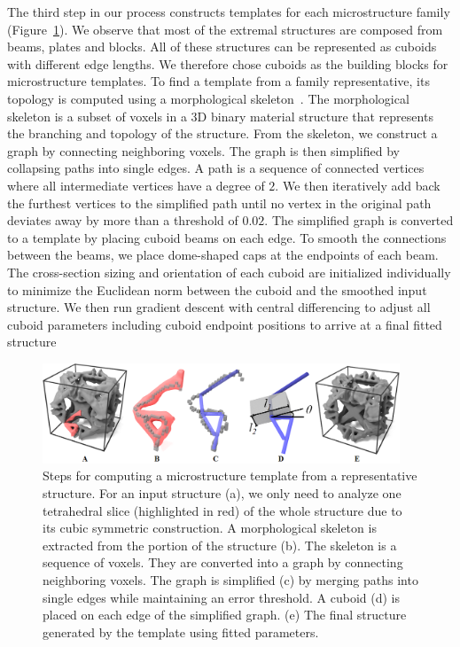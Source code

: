 The third step in our process constructs templates for each microstructure family (Figure~\ref{fig:skelExtract}). We observe that most of the extremal structures are composed from beams, plates and blocks. All of these structures can be represented as cuboids with different edge lengths.
We therefore chose cuboids as the building blocks for microstructure templates.
To find a template from a family representative, its topology is computed using a morphological skeleton~\citep{lee1994building}.
The morphological skeleton is a subset of voxels in a 3D binary material structure that represents the branching and topology of the structure.
From the skeleton, we construct a graph by connecting neighboring voxels.
The graph is then simplified by collapsing paths into single edges.
A path is a sequence of connected vertices where all intermediate vertices have a degree of $2$.
We then iteratively add back the furthest vertices to the simplified path until no vertex in the original path deviates away by more than a threshold of $0.02$.
The simplified graph is converted to a template by placing cuboid beams on each edge.
To smooth the connections between the beams, we place dome-shaped caps at the endpoints of each beam.
The cross-section sizing and orientation of each cuboid are initialized individually to minimize the Euclidean norm between the cuboid and the smoothed input structure. We then run gradient descent with central differencing to adjust all cuboid parameters including cuboid endpoint positions to arrive at a final fitted structure 
\begin{figure}
	\centering
	\includegraphics[width=0.95\textwidth]{images/skeletonExtraction.png}
	\caption{Steps for computing a microstructure template from a representative structure. For an input structure (a), we only need to analyze one tetrahedral slice (highlighted in red) of the whole structure due to its cubic symmetric construction. A morphological skeleton is extracted from the portion of the structure (b). The skeleton is a sequence of voxels. They are converted into a graph by connecting neighboring voxels. The graph is simplified (c) by merging paths into single edges while maintaining an error threshold. A cuboid (d) is placed on each edge of the simplified graph. (e) The final structure generated by the template using fitted parameters.}
	\label{fig:skelExtract}
\end{figure}

